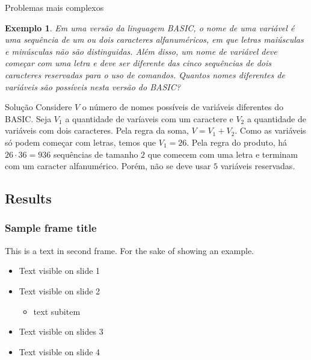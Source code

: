 \documentclass[aspectratio=169,t]{beamer}
\newtheorem{ex}{Exemplo}
\begin{document}

 \begin{frame}{Problemas mais complexos}
\footnotesize
  \begin{ex}
Em uma versão da linguagem BASIC, o nome de uma variável é uma sequência de um ou dois caracteres alfanuméricos, em que letras maiúsculas e minúsculas não são distinguidas. Além disso, um nome de variável deve começar com uma letra e deve ser diferente das cinco sequências de dois caracteres reservadas para o uso de comandos. Quantos nomes diferentes de variáveis são possíveis nesta versão do BASIC?
  \end{ex}

\begin{block}{Solução}
Considere $V$ o número de nomes possíveis de variáveis diferentes do BASIC. Seja $V_1$ a quantidade de varíaveis com um caractere e $V_2$ a quantidade de variáveis com dois caracteres. Pela regra da soma, $V=V_1+V_2$. Como as variáveis só podem começar com letras, temos que $V_1=26$. Pela regra do produto, há $26\cdot 36=936$ sequências de tamanho $2$ que comecem com uma letra e terminam com um caracter alfanumérico. Porém, não se deve usar $5$ variáveis reservadas.
  \end{block}

 \end{frame}


\subsection{Results}
\begin{frame}
\frametitle{Sample frame title}
This is a text in second frame. For the sake of showing an example.

\begin{itemize}
    \item<1-> Text visible on slide 1
    \item<2-> Text visible on slide 2
    \begin{itemize}
        \item text subitem
    \end{itemize}
    \item<3> Text visible on slides 3
    \item<4-> Text visible on slide 4
\end{itemize}
\end{frame}


\titlepage
\end{document}
